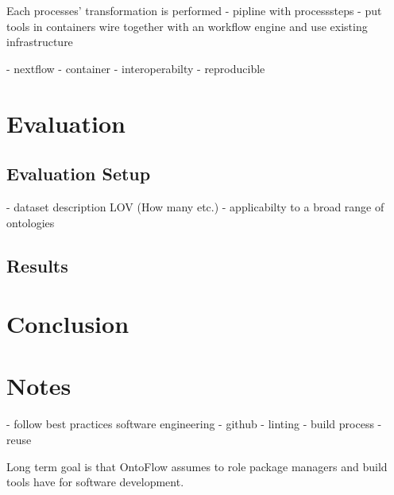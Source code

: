 \documentclass[sigconf]{acmart}
\begin{document}
Each processes' transformation is performed
- pipline with processsteps
- put tools in containers wire together with an workflow engine and use existing infrastructure

- nextflow
- container
  - interoperabilty
  - reproducible

\section{Evaluation}

\subsection{Evaluation Setup}
- dataset description LOV (How many etc.)
- applicabilty to a broad range of ontologies 
\subsection{Results}
\section{Conclusion}
\section{Notes}
- follow best practices software engineering
  - github
  - linting
  - build process
  - reuse

Long term goal is that OntoFlow assumes to role package managers and build tools have for software development.


\end{document}

